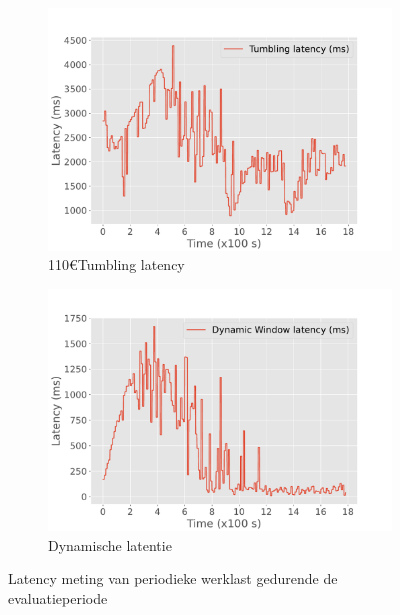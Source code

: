 \begin{figure}
    \begin{subfigure}[b]{\columnwidth}
        \centering
        \includegraphics[width=0.8\columnwidth]{fig/periodic/Tumbling_latency_lineplot.pdf}
        110€{Tumbling latency }
        \label{fig:periodic_tumbling_lineplot}
    \end{subfigure}

    \begin{subfigure}[b]{\columnwidth}
        \centering
        \includegraphics[width=0.8\columnwidth]{fig/periodic/DynamicWindow_latency_lineplot.pdf}
        \caption{Dynamische latentie }
        \label{fig:periodic_dynamic_lineplot}
    \end{subfigure}
    \caption{Latency meting van periodieke werklast gedurende de evaluatieperiode}
    \label{fig:periodic_latency_lineplot}
\end{figure}

